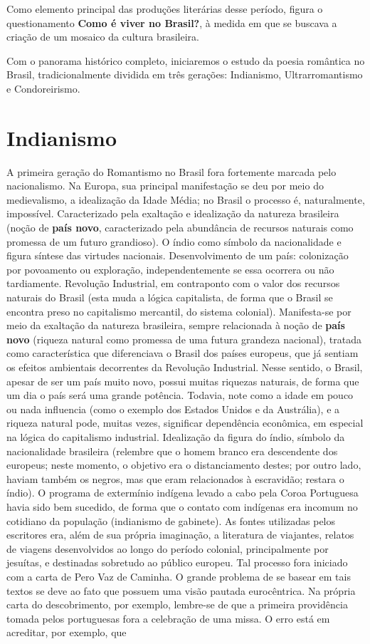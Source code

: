 Como elemento principal das produções literárias desse período, figura o questionamento \textbf{Como é viver no Brasil?}, à medida em que se buscava a criação de um mosaico da cultura brasileira.

Com o panorama histórico completo, iniciaremos o estudo da poesia romântica no Brasil, tradicionalmente dividida em três gerações: Indianismo, Ultrarromantismo e Condoreirismo.

\section{Indianismo}

A primeira geração do Romantismo no Brasil fora fortemente marcada pelo nacionalismo. Na Europa, sua principal manifestação se deu por meio do medievalismo, a idealização da Idade Média; no Brasil o processo é, naturalmente, impossível. Caracterizado pela exaltação e idealização da natureza brasileira (noção de \textbf{país novo}, caracterizado pela abundância de recursos naturais como promessa de um futuro grandioso). O índio como símbolo da nacionalidade e figura síntese das virtudes nacionais. Desenvolvimento de um país: colonização por povoamento ou exploração, independentemente se essa ocorrera ou não tardiamente. Revolução Industrial, em contraponto com o valor dos recursos naturais do Brasil (esta muda a lógica capitalista, de forma que o Brasil se encontra preso no capitalismo mercantil, do sistema colonial). Manifesta-se por meio da exaltação da natureza brasileira, sempre relacionada à noção de \textbf{país novo} (riqueza natural como promessa de uma futura grandeza nacional), tratada como característica que diferenciava o Brasil dos países europeus, que já sentiam os efeitos ambientais decorrentes da Revolução Industrial. Nesse sentido, o Brasil, apesar de ser um país muito novo, possui muitas riquezas naturais, de forma que um dia o país será uma grande potência. Todavia, note como a idade em pouco ou nada influencia (como o exemplo dos Estados Unidos e da Austrália), e a riqueza natural pode, muitas vezes, significar dependência econômica, em especial na lógica do capitalismo industrial. Idealização da figura do índio, símbolo da nacionalidade brasileira (relembre que o homem branco era descendente dos europeus; neste momento, o objetivo era o distanciamento destes; por outro lado, haviam também os negros, mas que eram relacionados à escravidão; restara o índio). O programa de extermínio indígena levado a cabo pela Coroa Portuguesa havia sido bem sucedido, de forma que o contato com indígenas era incomum no cotidiano da população (indianismo de gabinete). As fontes utilizadas pelos escritores era, além de sua própria imaginação, a literatura de viajantes, relatos de viagens desenvolvidos ao longo do período colonial, principalmente por jesuítas, e destinadas sobretudo ao público europeu. Tal processo fora iniciado com a carta de Pero Vaz de Caminha. O grande problema de se basear em tais textos se deve ao fato que possuem uma visão pautada eurocêntrica. Na própria carta do descobrimento, por exemplo, lembre-se de que a primeira providência tomada pelos portuguesas fora a celebração de uma missa. O erro está em acreditar, por exemplo, que 